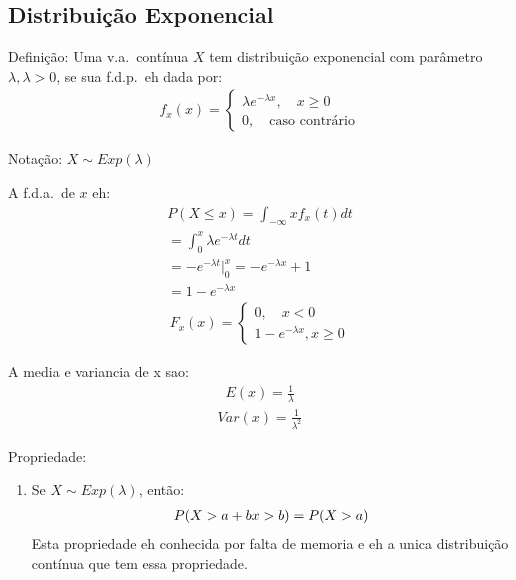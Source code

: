 \subsection{Distribuição Exponencial}
\begin{description}
  \item {Definição}: Uma v.a.\ contínua $X$ tem distribuição exponencial com parâmetro $\lambda, \lambda>0$, se sua
    f.d.p.\ eh dada por:
    \begin{align*}
      f_{x} (x)= \begin{cases}
        \lambda e^{- \lambda x} , \quad x \ge 0 \\
        0, \quad \text{caso contrário}
      \end{cases}
    \end{align*}
  \item{Notação}: $X \mathtt{\sim} Exp(\lambda)$
    \item A f.d.a.\ de $x$ eh:
      \begin{align*}
        P(X \le x)  = \int_{ -\infty }{x} f_{x}(t)dt \\
        = \int_{0}^{x} \lambda e^{-\lambda t } dt \\
        = -e^{-\lambda t} |_{0}^{x} = -e^{-\lambda x} +1\\
        = 1- e^{-\lambda x}
      \end{align*}
      \begin{align*}
        F_{x} (x) = \begin{cases}
         0, \quad x<0\\
         1-e^{-\lambda x} , x\ge 0
        \end{cases}
      \end{align*}
    \item A media e variancia de x sao:
      \begin{align*}
        E(x) = \frac{1}{\lambda}
      \end{align*}
      \begin{align*}
        Var(x) = \frac{1}{\lambda^2}
      \end{align*}
    \item{Propriedade}:
      \begin{enumerate}
        \item Se $X \mathtt{\sim}  Exp(\lambda)$, então:
        \begin{align*}
          P(X> a+b  \/ x>b) = P(X > a)
        \end{align*}
        Esta propriedade eh conhecida por falta de memoria e eh a unica distribuição 
        contínua que tem essa propriedade.


\end{enumerate}
\end{description}
